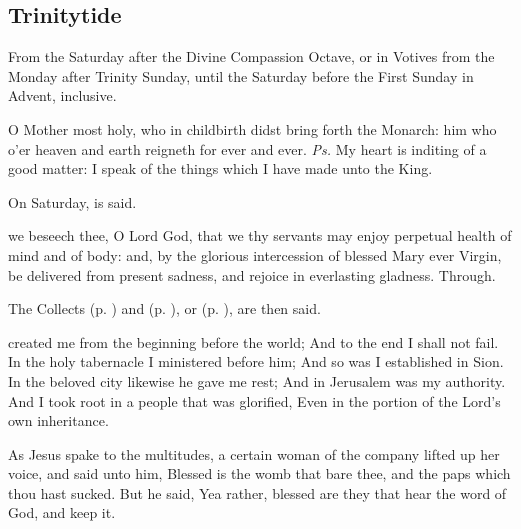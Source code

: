 \subsection{Trinitytide}
\begin{rubric}
    {From the Saturday after the Divine Compassion Octave, or in Votives from the Monday after Trinity Sunday, until the Saturday before the First Sunday in Advent, inclusive.}
\end{rubric}
\introit
{} O Mother most holy, who in childbirth didst bring forth the Monarch: him who o'er heaven and earth reigneth for ever and ever. \textit{Ps.} My heart is inditing of a good matter: I speak of the things which I have made unto the King.
\begin{rubric}
    On Saturday,  is said.
\end{rubric}
\collect
{} we beseech thee, O Lord God, that we thy servants may enjoy perpetual health of mind and of body: and, by the glorious intercession of blessed Mary ever Virgin, be delivered from present sadness, and rejoice in everlasting gladness. Through.
\begin{rubric}
    The Collects  (p. \pageref{SPHolyGhost}) and  (p. \pageref{SPAgainst}), or  (p. \pageref{SPChiefBishop}), are then said.
\end{rubric}
 created me from the beginning before the world; And to the end I shall not fail. In the holy tabernacle I ministered before him; And so was I established in Sion. In the beloved city likewise he gave me rest; And in Jerusalem was my authority. And I took root in a people that was glorified, Even in the portion of the Lord’s own inheritance.


\clearpage
{}
 As Jesus spake to the multitudes, a certain woman of the company lifted up her voice, and said unto him, Blessed is the womb that bare thee, and the paps which thou hast sucked. But he said, Yea rather, blessed are they that hear the word of God, and keep it.

